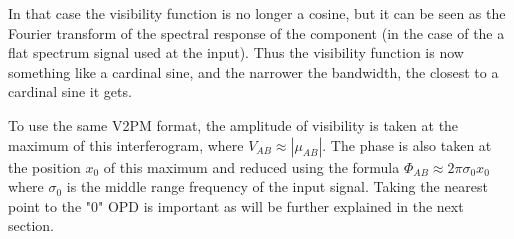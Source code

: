 In that case the visibility function is no longer a cosine, but it can be seen as the Fourier transform of the spectral response of the component (in the case of the a flat spectrum signal used at the input). Thus the visibility function is now something like a cardinal sine, and the narrower the bandwidth, the closest to a cardinal sine it gets.

To use the same V2PM format, the amplitude of visibility is taken at the maximum of this interferogram, where $V_{AB} \approx \left|\mu_{AB}\right|$. The phase is also taken at the position $x_0$ of this maximum and reduced using the formula $\Phi_{AB} \approx 2\pi\sigma_0 x_0$ where $\sigma_0$ is the middle range frequency of the input signal. Taking the nearest point to the "0" OPD is important as will be further explained in the next section.  

